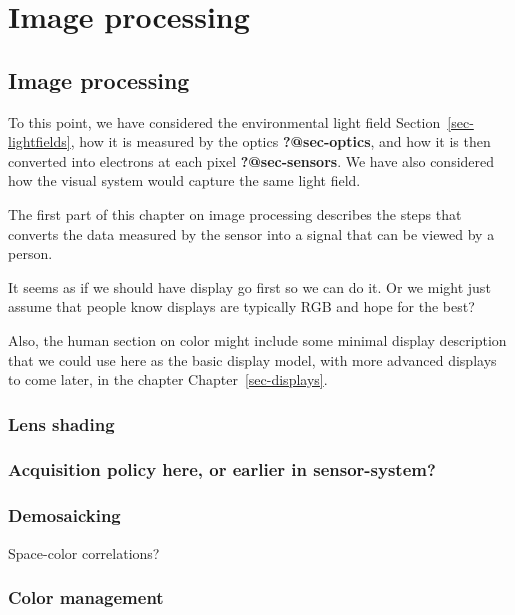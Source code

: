 \documentclass[
  letterpaper,
]{book}
\begin{document}
\part{Image processing}

\chapter{Image processing}\label{sec-imgprocessing}

To this point, we have considered the environmental light field
Section~\ref{sec-lightfields}, how it is measured by the optics
\textbf{?@sec-optics}, and how it is then converted into electrons at
each pixel \textbf{?@sec-sensors}. We have also considered how the
visual system would capture the same light field.

The first part of this chapter on image processing describes the steps
that converts the data measured by the sensor into a signal that can be
viewed by a person.

It seems as if we should have display go first so we can do it. Or we
might just assume that people know displays are typically RGB and hope
for the best?

Also, the human section on color might include some minimal display
description that we could use here as the basic display model, with more
advanced displays to come later, in the chapter
Chapter~\ref{sec-displays}.

\section{Lens shading}\label{lens-shading}

\section{Acquisition policy here, or earlier in
sensor-system?}\label{acquisition-policy-here-or-earlier-in-sensor-system}

\section{Demosaicking}\label{demosaicking}

Space-color correlations?

\section{Color management}\label{color-management}
\end{document}
